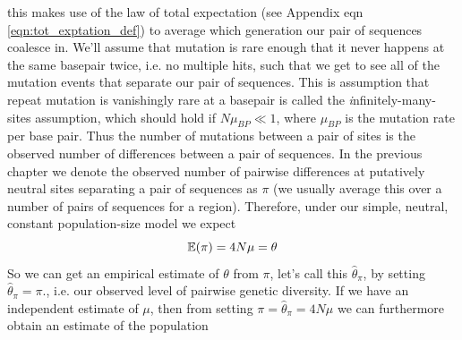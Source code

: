 this makes use of the law of total expectation (see Appendix eqn \eqref{eqn:tot_exptation_def}) to average which generation our pair of sequences coalesce in. 
%
We'll assume that mutation is rare enough that it never happens at the same basepair twice, i.e. no multiple hits, such that we get to see all of the mutation events that separate our pair
of sequences. This is assumption that repeat mutation is vanishingly rare at a basepair is called the {\emph infinitely-many-sites} assumption,
which should hold if $N\mu_{BP} \ll 1$, where $\mu_{BP}$ is the mutation rate per base pair. Thus the number of
mutations between a pair of sites is the observed number of
differences between a pair of sequences. In the previous chapter we denote the observed number of pairwise differences at putatively neutral
sites separating a pair of sequences as $\pi$ (we usually average this over a
number of pairs of sequences for a region). Therefore, under our simple, neutral, constant population-size model we expect
\begin{equation}
\mathbb{E}(\pi) = 4 N \mu = \theta
\end{equation}
So we can get an empirical estimate of $\theta$ from
$\pi$, let's call this $\widehat{\theta}_{\pi}$, by setting $\widehat{\theta}_{\pi}=\pi$., i.e. our observed level of pairwise genetic diversity.  If we
have an independent estimate of $\mu$, then from setting $\pi =\widehat{\theta}_{\pi} = 4N\mu$ we can furthermore obtain an estimate of the population
